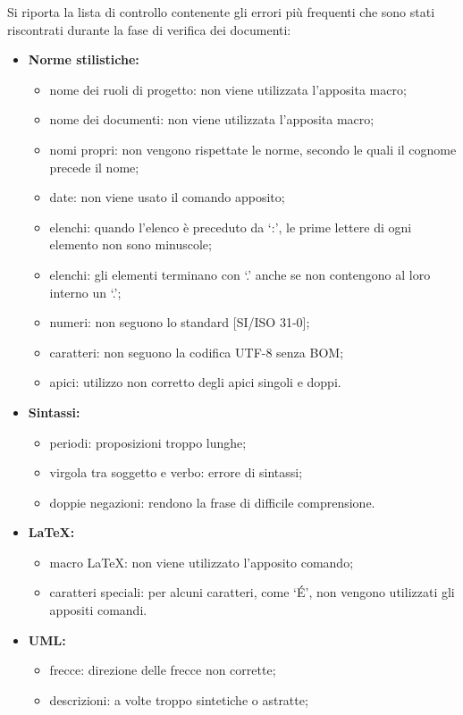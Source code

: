 Si riporta la lista di controllo contenente gli errori più frequenti che sono stati riscontrati durante la fase di verifica dei documenti:
\begin{itemize}
	\item \textbf{Norme stilistiche:}
	\begin{itemize}
		\item nome dei ruoli di progetto: non viene utilizzata l'apposita macro;
		\item nome dei documenti: non viene utilizzata l'apposita macro;
		\item nomi propri: non vengono rispettate le norme, secondo le quali il cognome precede il nome;
		\item date: non viene usato il comando apposito;
		\item elenchi: quando l'elenco è preceduto da ‘:’, le prime lettere di ogni elemento non sono minuscole;
		\item elenchi: gli elementi terminano con ‘.’ anche se non contengono al loro interno un ‘.’;
		\item numeri: non seguono lo standard [SI/ISO 31-0];
		\item caratteri: non seguono la codifica UTF-8 senza BOM;
		\item apici: utilizzo non corretto degli apici singoli e doppi.
	\end{itemize}
	\item \textbf{Sintassi:}
	\begin{itemize}
		\item periodi: proposizioni troppo lunghe;
		\item virgola tra soggetto e verbo: errore di sintassi;
		\item doppie negazioni: rendono la frase di difficile comprensione.
	\end{itemize}
	\item \textbf{\LaTeX{}:}
	\begin{itemize}
		\item macro \LaTeX{}: non viene utilizzato l'apposito comando;
		\item caratteri speciali: per alcuni caratteri, come ‘\'{E}’, non vengono utilizzati gli appositi comandi.
	\end{itemize}
	\item \textbf{UML:}
	\begin{itemize}
		\item frecce: direzione delle frecce non corrette;
		\item descrizioni: a volte troppo sintetiche o astratte;

\end{itemize}
\end{itemize}

